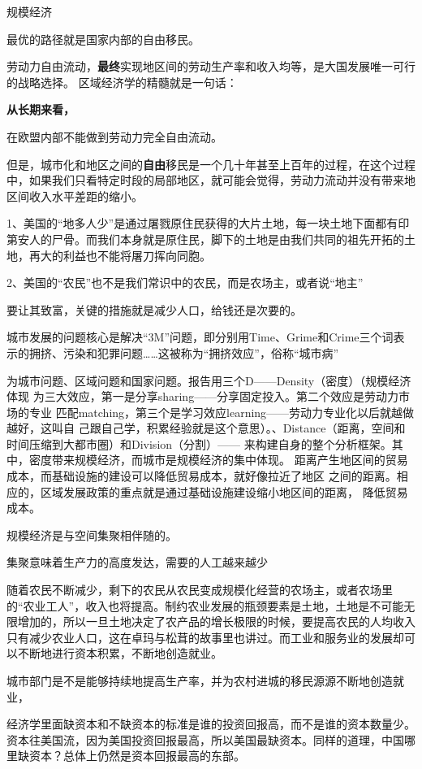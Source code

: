 规模经济

最优的路径就是国家内部的自由移民。

劳动力自由流动，{\bf 最终}实现地区间的劳动生产率和收入均等，是大国发展唯一可行的战略选择。
区域经济学的精髓就是一句话：

{\bf 从长期来看，}

在欧盟内部不能做到劳动力完全自由流动。


但是，城市化和地区之间的{\bf 自由}移民是一个几十年甚至上百年的过程，在这个过程中，如果我们只看特定时段的局部地区，就可能会觉得，劳动力流动并没有带来地区间收入水平差距的缩小。

1、美国的“地多人少”是通过屠戮原住民获得的大片土地，每一块土地下面都有印第安人的尸骨。而我们本身就是原住民，脚下的土地是由我们共同的祖先开拓的土地，再大的利益也不能将屠刀挥向同胞。

2、美国的“农民”也不是我们常识中的农民，而是农场主，或者说“地主”

要让其致富，关键的措施就是减少人口，给钱还是次要的。

城市发展的问题核心是解决“3M”问题，即分别用Time、Grime和Crime三个词表示的拥挤、污染和犯罪问题……这被称为“拥挤效应”，俗称“城市病”

为城市问题、区域问题和国家问题。报告用三个D——Density（密度）（规模经济体现
为三大效应，第一是分享sharing——分享固定投入。第二个效应是劳动力市场的专业
匹配matching，第三个是学习效应learning——劳动力专业化以后就越做越好，这叫自
己跟自己学，积累经验就是这个意思）。、Distance（距离，空间和时间压缩到大都市圈）和Division（分割）——
来构建自身的整个分析框架。其中，密度带来规模经济，而城市是规模经济的集中体现。
距离产生地区间的贸易成本，而基础设施的建设可以降低贸易成本，就好像拉近了地区
之间的距离。相应的，区域发展政策的重点就是通过基础设施建设缩小地区间的距离，
降低贸易成本。

规模经济是与空间集聚相伴随的。

集聚意味着生产力的高度发达，需要的人工越来越少

随着农民不断减少，剩下的农民从农民变成规模化经营的农场主，或者农场里的“农业工人”，收入也将提高。制约农业发展的瓶颈要素是土地，土地是不可能无限增加的，所以一旦土地决定了农产品的增长极限的时候，要提高农民的人均收入只有减少农业人口，这在卓玛与松茸的故事里也讲过。而工业和服务业的发展却可以不断地进行资本积累，不断地创造就业。

城市部门是不是能够持续地提高生产率，并为农村进城的移民源源不断地创造就业，

经济学里面缺资本和不缺资本的标准是谁的投资回报高，而不是谁的资本数量少。资本往美国流，因为美国投资回报最高，所以美国最缺资本。同样的道理，中国哪里缺资本？总体上仍然是资本回报最高的东部。

